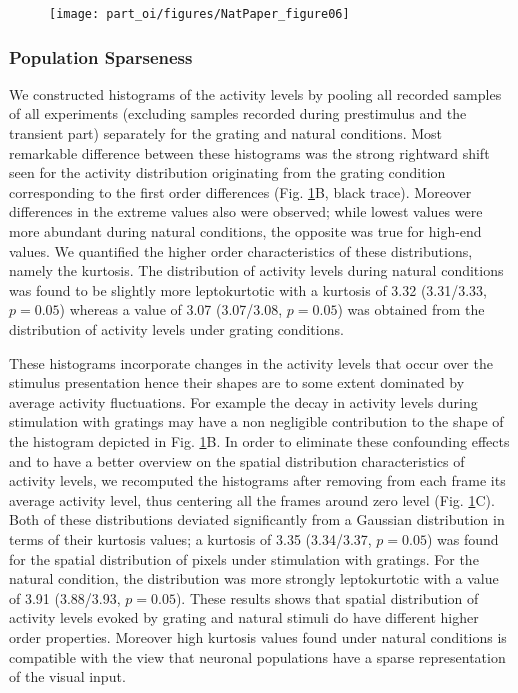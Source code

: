 \begin{figure} \centerline{
\texttt{[image: part\_oi/figures/NatPaper\_figure06]} }
\caption[Second and Higher Order Characteristics of Response Distributions.]{ \protect}
\label{np6}\end{figure} 

\subsubsection{Population Sparseness}

We constructed histograms of the activity levels by pooling all recorded
samples of all experiments (excluding samples recorded during prestimulus
and the transient part) separately for the grating and natural conditions.
Most remarkable difference between these histograms was the strong
rightward shift seen for the activity distribution originating from the
grating condition corresponding to the first order differences (Fig. \ref{np6}B,
black trace). Moreover differences in the extreme values also were
observed; while lowest values were more abundant during natural conditions,
the opposite was true for high-end values. We quantified the higher order
characteristics of these distributions, namely the kurtosis. The
distribution of activity levels during natural conditions was found to be
slightly more leptokurtotic with a kurtosis of 3.32 (3.31/3.33, $p = 0.05$)
whereas a value of 3.07 (3.07/3.08, $p = 0.05$) was obtained from the
distribution of activity levels under grating conditions. 

These histograms incorporate changes in the activity levels that occur over
the stimulus presentation hence their shapes are to some extent dominated
by average activity fluctuations. For example the decay in activity levels
during stimulation with gratings may have a non negligible contribution to
the shape of the histogram depicted in Fig. \ref{np6}B. In order to
eliminate these confounding effects and to have a better overview on the
spatial distribution characteristics of activity levels, we recomputed the
histograms after removing from each frame its average activity level, thus
centering all the frames around zero level (Fig.  \ref{np6}C). Both of
these distributions deviated significantly from a Gaussian distribution in
terms of their kurtosis values; a kurtosis of 3.35 (3.34/3.37, $p = 0.05$)
was found for the spatial distribution of pixels under stimulation with
gratings. For the natural condition, the distribution was more strongly
leptokurtotic with a value of 3.91 (3.88/3.93, $p = 0.05$). These results
shows that spatial distribution of activity levels evoked by grating and
natural stimuli do have different higher order properties. Moreover high
kurtosis values found under natural conditions is compatible with the view
that neuronal populations have a sparse representation of the visual input.
